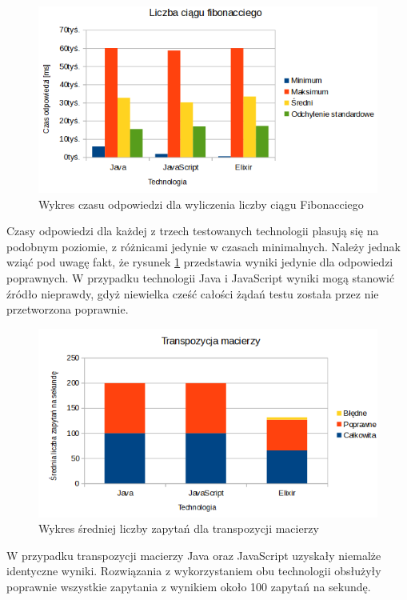 \documentclass[12pt,twoside]{article}
\begin{document}
\begin{figure}[!ht]
\centering
\includegraphics[resolution=120]{test_results/summary/fib_response.png}
\caption{Wykres czasu odpowiedzi dla wyliczenia liczby ciągu Fibonacciego}
\label{summary:fib:response}
\end{figure}

Czasy odpowiedzi dla każdej z trzech testowanych technologii plasują się
na podobnym poziomie, z różnicami jedynie w czasach minimalnych. Należy
jednak wziąć pod uwagę fakt, że rysunek \ref{summary:fib:response}
przedstawia wyniki jedynie dla odpowiedzi poprawnych. W przypadku
technologii Java i JavaScript wyniki mogą stanowić źródło nieprawdy,
gdyż niewielka cześć całości żądań testu została przez nie przetworzona
poprawnie.

\begin{figure}[!ht]
\centering
\includegraphics[resolution=120]{test_results/summary/matrix_avg.png}
\caption{Wykres średniej liczby zapytań dla transpozycji macierzy}
\end{figure}

W przypadku transpozycji macierzy Java oraz JavaScript uzyskały niemalże
identyczne wyniki. Rozwiązania z wykorzystaniem obu technologii
obsłużyły poprawnie wszystkie zapytania z wynikiem około 100 zapytań na
sekundę.
\end{document}
